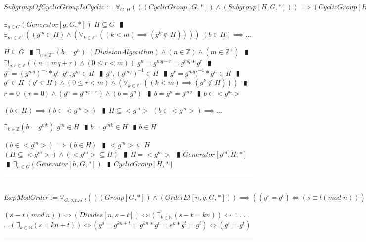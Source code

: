 \documentclass{book}
\newcommand{\abr}{:=}
\newcommand{\cont}{\phantom{.}. . .\phantom{.}}
\newcommand{\pipe}{$\phantom{(}\vrectangleblack\phantom{)}$}
\newcommand{\pr}[1]{\left(#1\right)}
\begin{document}
$SubgroupOfCyclicGroupIsCyclic \abr \forall_{G, H}\pr{\pr{(CyclicGroup[G, *]) \land (Subgroup[H, G, *])} \implies (CyclicGroup[H, *])}$
\begin{enumerate}
  \lit $\exists_{g \in G}(Generator[g, G, *])$
  \lit $H \subseteq G$ \pipe $\exists_{m \in \mathbb{Z}^+}\pr{(g^m \in H) \land \pr{\forall_{k \in \mathbb{Z}^+}\pr{(k < m) \implies (g^k \notin H)}}}$
  \lit $(b \in H) \implies \ldots$
  \begin{enumerate}
    \lit $H \subseteq G$ \pipe $\exists_{n \in \mathbb{Z}^+}(b = g^n)$
    \lit $(DivisionAlgorithm) \land (n \in \mathbb{Z}) \land (m \in \mathbb{Z}^+)$ \pipe $\exists!_{q, r \in \mathbb{Z}}\pr{(n = m q + r) \land (0 \leq r < m)}$
    \lit $g^n = g^{m q + r} = g^{m q} * g^r$ \pipe $g^r = (g^{m q})^{-1} * g^n$
    \lit $g^n, g^m \in H$ \pipe $g^n, (g^{m q})^{-1} \in H$ \pipe $g^r = g^{m q})^{-1} * g^n \in H$ \pipe $g^r \in H$
    \lit $(g^r \in H) \land (0 \leq r < m) \land \pr{\forall_{k \in \mathbb{Z}^+}\pr{(k < m) \implies (g^k \notin H)}}$ \pipe $r = 0$
    \lit $(r = 0) \land (g^n = g^{m q + r}) \land (b = g^n)$ \pipe $b = g^n = g^{m q}$ \pipe $b \in <g^m>$
  \end{enumerate}
  \lit $(b \in H) \implies (b \in <g^m>)$ \pipe $H \subseteq <g^m>$
  \lit $(b \in <g^m>) \implies \ldots$
  \begin{enumerate}
    \lit $\exists_{k \in \mathbb{Z}}(b = g^{m k})$
    \lit $g^m \in H$ \pipe $b = g^{m k} \in H$ \pipe $b \in H$
  \end{enumerate}
  \lit $(b \in <g^m>) \implies (b \in H)$ \pipe $<g^m> \subseteq H$
  \lit $(H \subseteq <g^m>) \land (<g^m> \subseteq H)$ \pipe $H = <g^m>$ \pipe $Generator[g^m, H, *]$ \pipe $\exists_{h \in G}(Generator[h, G, *])$ \pipe $CyclicGroup[H, *]$
\end{enumerate} \vspace{.75mm} \hrule \vspace{.75mm} \ \\ 

$ExpModOrder \abr \forall_{G, g, n, s, t}\pr{\pr{(Group[G, *]) \land (OrderEl[n, g, G, *])} \implies \pr{(g^s = g^t) \iff \pr{s \equiv t (mod \phantom{.} n)}}}$
\begin{enumerate}
  \lit $\pr{s \equiv t (mod \phantom{.} n)} \iff (Divides[n, s - t]) \iff \pr{\exists_{k \in \mathbb{N}}(s - t = k n)} \iff$ \cont
  \lit \cont $\pr{\exists_{k \in \mathbb{N}}(s = k n + t)} \iff (g^{s} = g^{k n + t} = g^{k n} * g^t = e^k * g^t = g^t) \iff (g^s = g^t)$
\end{enumerate} \vspace{.75mm} \hrule \vspace{.75mm} \ \\ 
\end{document}
